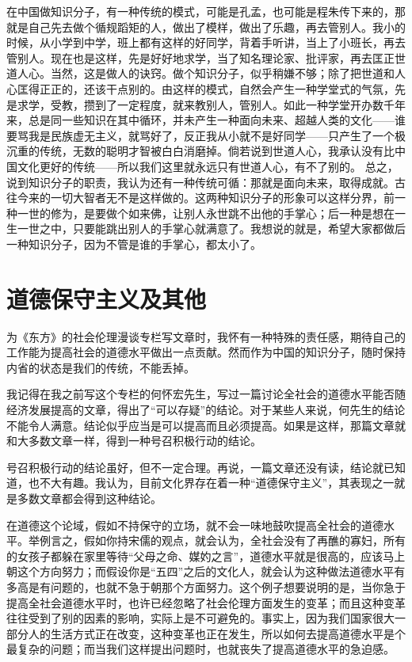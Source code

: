 在中国做知识分子，有一种传统的模式，可能是孔孟，也可能是程朱传下来的，那就是自己先去做个循规蹈矩的人，做出了模样，做出了乐趣，再去管别人。我小的时候，从小学到中学，班上都有这样的好同学，背着手听讲，当上了小班长，再去管别人。现在也是这样，先是好好地求学，当了知名理论家、批评家，再去匡正世道人心。当然，这是做人的诀窍。做个知识分子，似乎稍嫌不够；除了把世道和人心匡得正正的，还该干点别的。由这样的模式，自然会产生一种学堂式的气氛，先是求学，受教，攒到了一定程度，就来教别人，管别人。如此一种学堂开办数千年来，总是同一些知识在其中循环，并未产生一种面向未来、超越人类的文化——谁要骂我是民族虚无主义，就骂好了，反正我从小就不是好同学——只产生了一个极沉重的传统，无数的聪明才智被白白消磨掉。倘若说到世道人心，我承认没有比中国文化更好的传统——所以我们这里就永远只有世道人心，有不了别的。 总之，说到知识分子的职责，我认为还有一种传统可循：那就是面向未来，取得成就。古往今来的一切大智者无不是这样做的。这两种知识分子的形象可以这样分界，前一种一世的修为，是要做个如来佛，让别人永世跳不出他的手掌心；后一种是想在一生一世之中，只要能跳出别人的手掌心就满意了。我想说的就是，希望大家都做后一种知识分子，因为不管是谁的手掌心，都太小了。

\chapter{道德保守主义及其他}

为《东方》的社会伦理漫谈专栏写文章时，我怀有一种特殊的责任感，期待自己的工作能为提高社会的道德水平做出一点贡献。然而作为中国的知识分子，随时保持内省的状态是我们的传统，不能丢掉。 

我记得在我之前写这个专栏的何怀宏先生，写过一篇讨论全社会的道德水平能否随经济发展提高的文章，得出了“可以存疑”的结论。对于某些人来说，何先生的结论不能令人满意。结论似乎应当是可以提高而且必须提高。如果是这样，那篇文章就和大多数文章一样，得到一种号召积极行动的结论。 

号召积极行动的结论虽好，但不一定合理。再说，一篇文章还没有读，结论就已知道，也不大有趣。我认为，目前文化界存在着一种“道德保守主义”，其表现之一就是多数文章都会得到这种结论。 

在道德这个论域，假如不持保守的立场，就不会一味地鼓吹提高全社会的道德水平。举例言之，假如你持宋儒的观点，就会认为，全社会没有了再醮的寡妇，所有的女孩子都躲在家里等待“父母之命、媒妁之言”，道德水平就是很高的，应该马上朝这个方向努力；而假设你是“五四”之后的文化人，就会认为这种做法道德水平有多高是有问题的，也就不急于朝那个方面努力。这个例子想要说明的是，当你急于提高全社会道德水平时，也许已经忽略了社会伦理方面发生的变革；而且这种变革往往受到了别的因素的影响，实际上是不可避免的。事实上，因为我们国家很大一部分人的生活方式正在改变，这种变革也正在发生，所以如何去提高道德水平是个最复杂的问题；而当我们这样提出问题时，也就丧失了提高道德水平的急迫感。 

